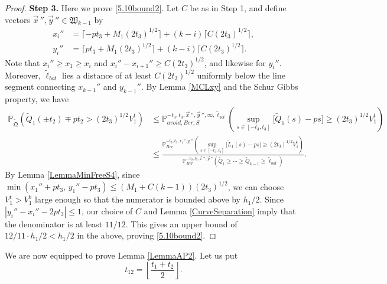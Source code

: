 \begin{proof}
	\noindent\textbf{Step 3.} Here we prove \eqref{5.10bound2}. Let $C$ be as in Step 1, and define vectors $\vec{x}\,'', \vec{y}\,''\in\mathfrak{W}_{k-1}$ by
	\begin{align*}
	x_i'' &= \lceil -pt_3 + M_1(2t_3)^{1/2}\rceil + (k-i)\lceil C(2t_3)^{1/2}\rceil,\\
	y_i'' &= \lceil pt_3 + M_1(2t_3)^{1/2}\rceil + (k-i)\lceil C(2t_3)^{1/2}\rceil.
	\end{align*}
	Note that $x_i'' \geq x_1 \geq x_i$ and $x_i''-x_{i+1}'' \geq C(2t_3)^{1/2}$, and likewise for $y_i''$. Moreover, $\tilde{\ell}_{bot}$ lies a distance of at least $C(2t_3)^{1/2}$ uniformly below the line segment connecting $x_{k-1}''$ and $y_{k-1}''$. By Lemma \ref{MCLxy} and the Schur Gibbs property, we have
	\begin{align*}
	\mathbb{P}_{\tilde{\mathfrak{Q}}}\left(\tilde{Q}_1(\pm t_2) \mp pt_2 > (2t_3)^{1/2}V_1^t\right) &\leq \mathbb{P}^{-t_3,t_3,\vec{x}\,'',\vec{y}\,'',\infty,\tilde{\ell}_{bot}}_{avoid,Ber;S}\left(\sup_{s\in[-t_3,t_3]} \big[\tilde{Q}_1(s)-ps\big] \geq (2t_3)^{1/2}V_1^t\right)\\
	&\leq \frac{\mathbb{P}^{-t_3,t_3,x_1'',y_1''}_{Ber}\left(\sup_{s\in[-t_3,t_3]} \big[\tilde{L}_1(s)-ps\big] \geq (2t_3)^{1/2}V_1^t\right)}{\mathbb{P}^{-t_3,t_3,\vec{x}\,'',\vec{y}\,''}_{Ber}\left(\tilde{Q}_1\geq\cdots\geq\tilde{Q}_{k-1}\geq\tilde{\ell}_{bot}\right)}.
	\end{align*}
	By Lemma \ref{LemmaMinFreeS4}, since $\min(x_1'' + pt_3, \, y_1'' - pt_3) \leq (M_1+C(k-1))(2t_3)^{1/2}$, we can choose $V_1^t > V_1^b$ large enough so that the numerator is bounded above by $h_1/2$. Since $|y_i'' - x_i'' - 2pt_3| \leq 1$, our choice of $C$ and Lemma \ref{CurveSeparation} imply that the denominator is at least $11/12$. This gives an upper bound of $12/11\cdot h_1/2 < h_1/2$ in the above, proving \eqref{5.10bound2}.
	
	
\end{proof}

We are now equipped to prove Lemma \ref{LemmaAP2}. Let us put
\begin{equation}\label{t12}
t_{12} = \left\lfloor \frac{t_1+t_2}{2}\right\rfloor.
\end{equation}

